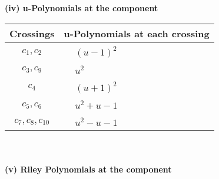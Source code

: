 \documentclass[1p]{elsarticle_modified}
\theoremstyle{definition}
\begin{document}
\newpage\renewcommand{\arraystretch}{1}
\flushleft \textbf{(iv) u-Polynomials at the component}\newline \\
\begin{tabular}{m{50pt}|m{274pt}}
Crossings & \hspace{64pt}u-Polynomials at each crossing \\
\hline $$\begin{aligned}c_{1},c_{2}\end{aligned}$$&$\begin{aligned}
&(u-1)^2
\end{aligned}$\\
\hline $$\begin{aligned}c_{3},c_{9}\end{aligned}$$&$\begin{aligned}
&u^2
\end{aligned}$\\
\hline $$\begin{aligned}c_{4}\end{aligned}$$&$\begin{aligned}
&(u+1)^2
\end{aligned}$\\
\hline $$\begin{aligned}c_{5},c_{6}\end{aligned}$$&$\begin{aligned}
&u^2+u-1
\end{aligned}$\\
\hline $$\begin{aligned}c_{7},c_{8},c_{10}\end{aligned}$$&$\begin{aligned}
&u^2- u-1
\end{aligned}$\\
\hline
\end{tabular}\\~\\
\newpage\renewcommand{\arraystretch}{1}
\flushleft \textbf{(v) Riley Polynomials at the component}\newline \\
\end{document}
